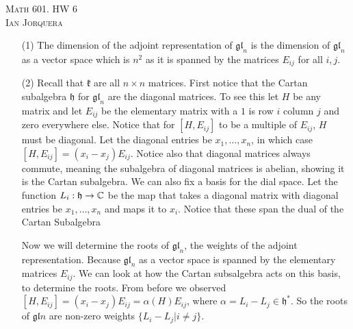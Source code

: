 \documentclass[12pt]{amsart}
\begin{document}
\begin{center}
    \textsc{Math 601. HW 6\\ Ian Jorquera}
\end{center}
\vspace{1em}
\begin{itemize} %
    \item[(1)] %
    The dimension of the adjoint representation of $\mathfrak{gl}_n$ is the 
    dimension of $\mathfrak{gl}_n$ as a vector space which is $n^2$ as it is spanned by 
    the matrices $E_{ij}$ for all $i,j$.\\
    \item[(2)] %
    Recall that $\mathfrak{k}$ are all $n\times n$ matrices. 
    First notice that the Cartan subalgebra $\mathfrak{h}$ for $\mathfrak{gl}_n$ 
    are the diagonal matrices. To see this let $H$ be any matrix and let $E_{ij}$ 
    be the elementary matrix with a $1$ is row $i$ column $j$ and zero everywhere else.
    Notice that for $[H,{E_{ij}}]$ to be a multiple of $E_{ij}$, $H$ must be diagonal.
    Let the diagonal entries be $x_1,\dots, x_n$, in which case $[H,{E_{ij}}]=(x_i-x_j)E_{ij}$.
    Notice also that diagonal matrices always commute, meaning the 
    subalgebra of diagonal matrices is abelian, showing it is the Cartan subalgebra.
    We can also fix a basis for the dial space.
    Let the function $L_i:\mathfrak{h}\rightarrow \mathbb{C}$ be the map that takes a diagonal matrix
    with diagonal entries be $x_1,\dots, x_n$ and maps it to $x_i$. Notice that these span 
    the dual of the Cartan Subalgebra

    Now we will determine the roots of $\mathfrak{gl}_n$, the weights of the adjoint 
    representation. Because $\mathfrak{gl}_n$ 
    as a vector space is spanned by the elementary matrices $E_{ij}$. We can look at how the 
    Cartan subsalgebra acts on this basis, to determine the roots. From before we observed
    $[H,{E_{ij}}]=(x_i-x_j)E_{ij}=\alpha(H)E_{ij}$, where $\alpha=L_i-L_j\in\mathfrak{h}^*$.
    So the roots of $\mathfrak{gl}n$ are non-zero weights $\{L_i-L_j| i\neq j\}$.


\end{itemize}
\end{document}
